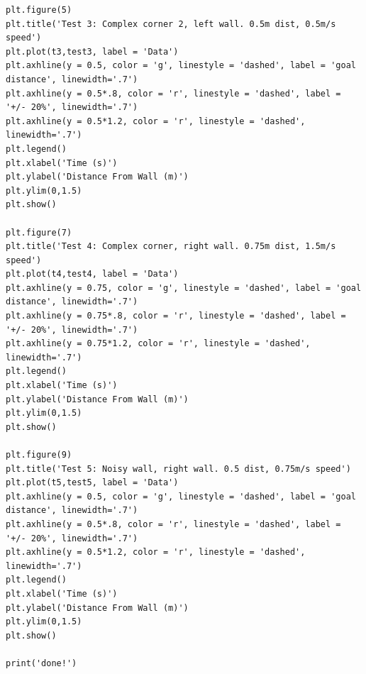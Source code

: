 \documentclass{article}
\begin{document}
{\begin{verbatim}
plt.figure(5)
plt.title('Test 3: Complex corner 2, left wall. 0.5m dist, 0.5m/s speed')
plt.plot(t3,test3, label = 'Data')
plt.axhline(y = 0.5, color = 'g', linestyle = 'dashed', label = 'goal distance', linewidth='.7')
plt.axhline(y = 0.5*.8, color = 'r', linestyle = 'dashed', label = '+/- 20%', linewidth='.7')
plt.axhline(y = 0.5*1.2, color = 'r', linestyle = 'dashed', linewidth='.7')
plt.legend()
plt.xlabel('Time (s)')
plt.ylabel('Distance From Wall (m)')
plt.ylim(0,1.5)
plt.show()

plt.figure(7)
plt.title('Test 4: Complex corner, right wall. 0.75m dist, 1.5m/s speed')
plt.plot(t4,test4, label = 'Data')
plt.axhline(y = 0.75, color = 'g', linestyle = 'dashed', label = 'goal distance', linewidth='.7')
plt.axhline(y = 0.75*.8, color = 'r', linestyle = 'dashed', label = '+/- 20%', linewidth='.7')
plt.axhline(y = 0.75*1.2, color = 'r', linestyle = 'dashed', linewidth='.7')
plt.legend()
plt.xlabel('Time (s)')
plt.ylabel('Distance From Wall (m)')
plt.ylim(0,1.5)
plt.show()

plt.figure(9)
plt.title('Test 5: Noisy wall, right wall. 0.5 dist, 0.75m/s speed')
plt.plot(t5,test5, label = 'Data')
plt.axhline(y = 0.5, color = 'g', linestyle = 'dashed', label = 'goal distance', linewidth='.7')
plt.axhline(y = 0.5*.8, color = 'r', linestyle = 'dashed', label = '+/- 20%', linewidth='.7')
plt.axhline(y = 0.5*1.2, color = 'r', linestyle = 'dashed', linewidth='.7')
plt.legend()
plt.xlabel('Time (s)')
plt.ylabel('Distance From Wall (m)')
plt.ylim(0,1.5)
plt.show()

print('done!')
\end{verbatim}
}
























\end{document}

